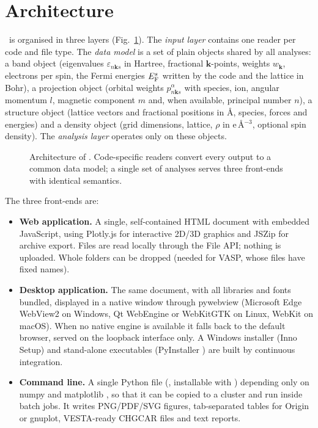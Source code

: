 \section{Architecture}\label{sec:arch}
\BMR\ is organised in three layers (Fig.~\ref{fig:arch}). The \emph{input layer} contains one reader per code and file type. The \emph{data model} is a set of plain objects shared by all analyses: a band object (eigenvalues $\varepsilon_{n\bm{k} s}$ in Hartree, fractional $\bm{k}$-points, weights $w_{\bm{k}}$, electrons per spin, the Fermi energies $E_\mathrm{F}^{s}$ written by the code and the lattice in Bohr), a projection object (orbital weights $p^{\alpha}_{n\bm{k} s}$ with species, ion, angular momentum $l$, magnetic component $m$ and, when available, principal number $n$), a structure object (lattice vectors and fractional positions in \AA, species, forces and energies) and a density object (grid dimensions, lattice, $\rho$ in e\,\AA$^{-3}$, optional spin density). The \emph{analysis layer} operates only on these objects.

\begin{figure}[t]\centering

\caption{Architecture of \BMR. Code-specific readers convert every output to a common data model; a single set of analyses serves three front-ends with identical semantics.}\label{fig:arch}
\end{figure}

The three front-ends are:
\begin{itemize}
  \item \textbf{Web application.} A single, self-contained HTML document with embedded JavaScript, using Plotly.js for interactive 2D/3D graphics and JSZip for archive export. Files are read locally through the File API; nothing is uploaded. Whole folders can be dropped (needed for VASP, whose files have fixed names).
  \item \textbf{Desktop application.} The same document, with all libraries and fonts bundled, displayed in a native window through pywebview \cite{pywebview} (Microsoft Edge WebView2 on Windows, Qt WebEngine or WebKitGTK on Linux, WebKit on macOS). When no native engine is available it falls back to the default browser, served on the loopback interface only. A Windows installer (Inno Setup) and stand-alone executables (PyInstaller \cite{pyinstaller}) are built by continuous integration.
  \item \textbf{Command line.} A single Python file (, installable with ) depending only on numpy \cite{harris2020numpy} and matplotlib \cite{hunter2007matplotlib}, so that it can be copied to a cluster and run inside batch jobs. It writes PNG/PDF/SVG figures, tab-separated  tables for Origin or gnuplot, VESTA-ready CHGCAR files and text reports.
\end{itemize}

